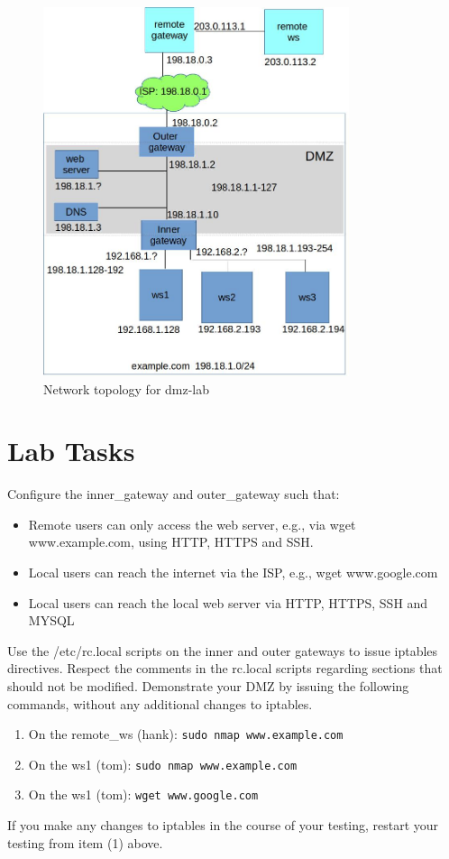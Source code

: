 \begin{figure}[htb]
\begin{center}
\includegraphics [width=0.8\textwidth,natwidth=621,natheight=403]{dmz-lab.jpg}
\end{center}
\caption{Network topology for dmz-lab}
\label{fig:topology}
\end{figure}

\section{Lab Tasks}
Configure the inner\_gateway and outer\_gateway such that:
\begin{itemize}
\item Remote users can only access the web server, e.g., via wget www.example.com, using
HTTP, HTTPS and SSH.
\item Local users can reach the internet via the ISP, e.g., wget www.google.com
\item Local users can reach the local web server via HTTP, HTTPS, SSH and MYSQL
\end{itemize}

Use the /etc/rc.local scripts on the inner and outer gateways to issue iptables directives.
Respect the comments in the rc.local scripts regarding sections that should not be modified.
Demonstrate your DMZ by issuing the following commands, without any additional changes to iptables.
\begin{enumerate}
\item On the remote\_ws (hank): {\tt sudo nmap www.example.com}
\item On the ws1 (tom): {\tt sudo nmap www.example.com}
\item On the ws1 (tom): {\tt wget www.google.com}
\end{enumerate}
\noindent If you make any changes to iptables in the course of your testing, restart your testing from
item (1) above.

